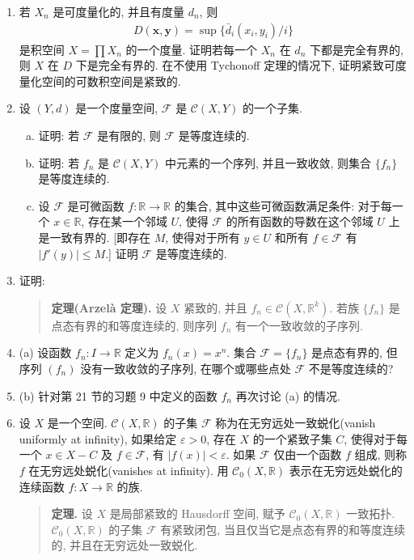 \documentclass[../../main.tex]{subfiles}
\begin{document}
\begin{enumerate}
\item 若 $X_n$ 是可度量化的, 并且有度量 $d_n$, 则
\begin{align*}
D(\mathbf{x},\mathbf{y})=\sup\{\bar{d}_i(x_i,y_i)/i\}
\end{align*}
是积空间 $X=\prod X_n$ 的一个度量. 证明若每一个 $X_n$ 在 $d_n$ 下都是完全有界的, 则 $X$ 在 $D$ 下是完全有界的. 在不使用 Tychonoff 定理的情况下, 证明紧致可度量化空间的可数积空间是紧致的.
\item 设 $(Y,d)$ 是一个度量空间, $\mathcal{F}$ 是 $\mathcal{C}(X,Y)$ 的一个子集.
\begin{enumerate}[(a)]
\item 证明: 若 $\mathcal{F}$ 是有限的, 则 $\mathcal{F}$ 是等度连续的.
\item 证明: 若 $f_n$ 是 $\mathcal{C}(X,Y)$ 中元素的一个序列, 并且一致收敛, 则集合 $\{f_n\}$ 是等度连续的.
\item 设 $\mathcal{F}$ 是可微函数 $f\colon\mathbb{R}\to\mathbb{R}$ 的集合, 其中这些可微函数满足条件: 对于每一个 $x\in\mathbb{R}$, 存在某一个邻域 $U$, 使得 $\mathcal{F}$ 的所有函数的导数在这个邻域 $U$ 上是一致有界的. [即存在 $M$, 使得对于所有 $y\in U$ 和所有 $f\in\mathcal{F}$ 有 $|f'(y)|\leqslant M$.] 证明 $\mathcal{F}$ 是等度连续的.
\end{enumerate}
\item 证明:
\begin{quote}
\textbf{定理(Arzelà 定理).} 设 $X$ 紧致的, 并且 $f_n\in\mathcal{C}(X,\mathbb{R}^k)$. 若族 $\{f_n\}$ 是点态有界的和等度连续的, 则序列 $f_n$ 有一个一致收敛的子序列.
\end{quote}
\item (a) 设函数 $f_n\colon I\to\mathbb{R}$ 定义为 $f_n(x)=x^n$. 集合 $\mathcal{F}=\{f_n\}$ 是点态有界的, 但序列 $(f_n)$ 没有一致收敛的子序列, 在哪个或哪些点处 $\mathcal{F}$ 不是等度连续的?
\item (b) 针对第 21 节的习题 9 中定义的函数 $f_n$ 再次讨论 (a) 的情况.
\item 设 $X$ 是一个空间. $\mathcal{C}(X,\mathbb{R})$ 的子集 $\mathcal{F}$ 称为在无穷远处一致蜕化(vanish uniformly at infinity), 如果给定 $\varepsilon>0$, 存在 $X$ 的一个紧致子集 $C$, 使得对于每一个 $x\in X-C$ 及 $f\in\mathcal{F}$, 有 $|f(x)|<\varepsilon$. 如果 $\mathcal{F}$ 仅由一个函数 $f$ 组成, 则称 $f$ 在无穷远处蜕化(vanishes at infinity). 用 $\mathcal{C}_0(X,\mathbb{R})$ 表示在无穷远处蜕化的连续函数 $f\colon X\to\mathbb{R}$ 的族.
\begin{quote}
\textbf{定理.} 设 $X$ 是局部紧致的 Hausdorff 空间, 赋予 $\mathcal{C}_0(X,\mathbb{R})$ 一致拓扑. $\mathcal{C}_0(X,\mathbb{R})$ 的子集 $\mathcal{F}$ 有紧致闭包, 当且仅当它是点态有界的和等度连续的, 并且在无穷远处一致蜕化.

\end{quote}
\end{enumerate}
\end{document}
